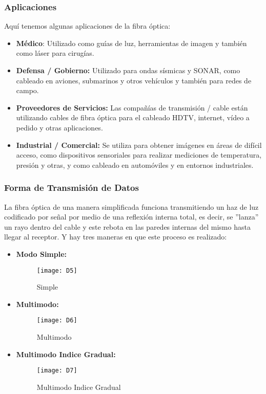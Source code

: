 \subsubsection{Aplicaciones}
Aquí tenemos algunas aplicaciones de la fibra óptica:
\begin{itemize}
\item \textbf{Médico}: Utilizado como guías de luz, herramientas de imagen y también como láser para cirugías.
\item \textbf{Defensa / Gobierno:} Utilizado para ondas sísmicas y SONAR, como cableado en aviones, submarinos y otros vehículos y también para redes de campo.
\item \textbf{Proveedores de Servicios:} Las compañías de transmisión / cable están utilizando cables de fibra óptica para el cableado HDTV, internet, vídeo a pedido y otras aplicaciones.
\item \textbf{Industrial / Comercial:} Se utiliza para obtener imágenes en áreas de difícil acceso, como dispositivos sensoriales para realizar mediciones de temperatura, presión y otras, y como cableado en automóviles y en entornos industriales.
\end{itemize}
\subsubsection{Forma de Transmisión de Datos}
La fibra óptica de una manera simplificada funciona transmitiendo un haz de luz codificado por señal por medio de una reflexión interna total, es decir, se ''lanza'' un rayo dentro del cable y este rebota en las paredes internas del mismo hasta llegar al receptor. Y hay tres maneras en que este proceso es realizado:
\begin{itemize}
\item \textbf{Modo Simple:}
\begin{figure}[!ht]
\centering
\texttt{[image: D5]}
\caption{Simple}
\end{figure}
\item \textbf{Multimodo:}
\begin{figure}[!ht]
\centering
\texttt{[image: D6]}
\caption{Multimodo}
\end{figure}
\item \textbf{Multimodo Indice Gradual:}
\begin{figure}[!ht]
\centering
\texttt{[image: D7]}
\caption{Multimodo Indice Gradual}
\end{figure}
\end{itemize}
